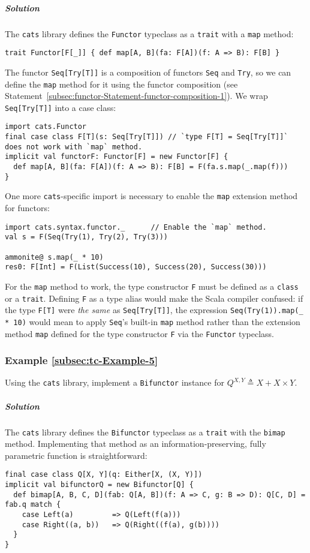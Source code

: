 \subparagraph{Solution}

The \texttt{cats} library defines the \lstinline!Functor! typeclass
as a \lstinline!trait! with a \lstinline!map! method:
\begin{lstlisting}
trait Functor[F[_]] { def map[A, B](fa: F[A])(f: A => B): F[B] }
\end{lstlisting}
The functor \lstinline!Seq[Try[T]]! is a composition of functors
\lstinline!Seq! and \lstinline!Try!, so we can define the \lstinline!map!
method for it using the functor composition (see Statement~\ref{subsec:functor-Statement-functor-composition-1}).
We wrap \lstinline!Seq[Try[T]]! into a case class:
\begin{lstlisting}
import cats.Functor
final case class F[T](s: Seq[Try[T]]) // `type F[T] = Seq[Try[T]]` does not work with `map` method.
implicit val functorF: Functor[F] = new Functor[F] {
  def map[A, B](fa: F[A])(f: A => B): F[B] = F(fa.s.map(_.map(f)))
}
\end{lstlisting}
One more \texttt{cats}-specific import is necessary to enable the
\lstinline!map! extension method for functors:
\begin{lstlisting}
import cats.syntax.functor._      // Enable the `map` method.
val s = F(Seq(Try(1), Try(2), Try(3)))

ammonite@ s.map(_ * 10)
res0: F[Int] = F(List(Success(10), Success(20), Success(30)))
\end{lstlisting}
For the \lstinline!map! method to work, the type constructor \lstinline!F!
must be defined as a \lstinline!class! or a \lstinline!trait!. Defining
\lstinline!F! as a type alias would make the Scala compiler confused:
if the type \lstinline!F[T]! were \emph{the same} as \lstinline!Seq[Try[T]]!,
the expression \lstinline!Seq(Try(1)).map(_ * 10)! would mean to
apply \lstinline!Seq!\textsf{'}s built-in \lstinline!map! method rather than
the extension method \lstinline!map! defined for the type constructor
\lstinline!F! via the \lstinline!Functor! typeclass.

\subsubsection{Example \label{subsec:tc-Example-5}\ref{subsec:tc-Example-5}}

Using the \texttt{cats} library, implement a \lstinline!Bifunctor!
instance for $Q^{X,Y}\triangleq X+X\times Y$.

\subparagraph{Solution}

The \texttt{cats} library defines the \lstinline!Bifunctor! typeclass
as a \lstinline!trait! with the \lstinline!bimap! method. Implementing
that method as an information-preserving, fully parametric function
is straightforward:
\begin{lstlisting}
final case class Q[X, Y](q: Either[X, (X, Y)])
implicit val bifunctorQ = new Bifunctor[Q] {
  def bimap[A, B, C, D](fab: Q[A, B])(f: A => C, g: B => D): Q[C, D] = fab.q match {
    case Left(a)         => Q(Left(f(a)))
    case Right((a, b))   => Q(Right((f(a), g(b))))
  }
}
\end{lstlisting}


